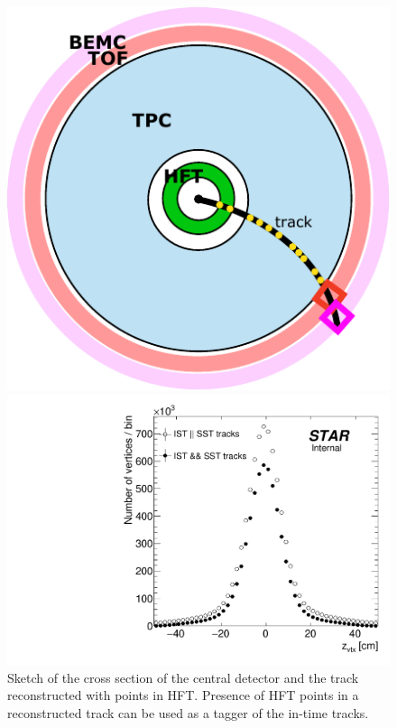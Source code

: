 \begin{figure}%
\centering%
\begin{minipage}{.4725\textwidth}%
  \centering%
  \includegraphics[width=0.965\linewidth]{graphics/systematicsEfficiency/TOF_tagAndProbe/effSketch.pdf}%
  \caption[Sketch of the track with points in HFT.]%
  {Sketch of the cross section of the central detector and the track reconstructed with points in HFT. Presence of HFT points in a reconstructed track can be used as a tagger of the in-time tracks.}
  \label{fig:hftEffSketch}
\end{minipage}%
\quad\quad%
\begin{minipage}{.4725\textwidth}%
  \centering%
  \includegraphics[width=\linewidth]{graphics/systematicsEfficiency/TOF_tagAndProbe/zVtxHFT.pdf}%

\end{minipage}
\end{figure}
